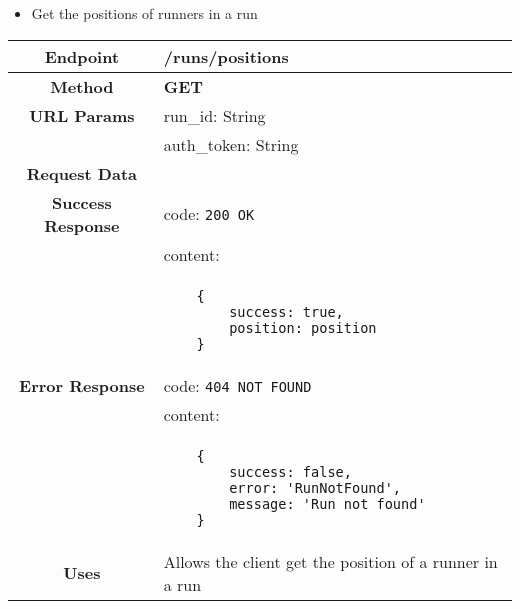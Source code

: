     
    \begin{itemize}
            \item Get the positions of runners in a run
        \end{itemize}
        \begin{adjustwidth}{1cm}{}
            \begin{longtable}{|c|l|}
                \hline
                \textbf{Endpoint} & /runs/positions \\
                \hline
                \textbf{Method} & \textbf{GET} \\
                \hline
                \textbf{URL Params} &  run\_id: String \\
                &                      auth\_token: String \\
                \hline
                \textbf{Request Data} & \\
                \hline
                \textbf{Success Response} & code: \texttt{200 OK} \\
                &                           content: \\
                & \begin{minipage}[t]{0.5\textwidth}
                    \begin{adjustwidth}{1.5cm}{}
                    \begin{verbatim}
    {
        success: true, 
        position: position
    }
                    \end{verbatim}
                    \end{adjustwidth}
                  \end{minipage} \\
                  \hline
                \textbf{Error Response} & code: \texttt{404 NOT FOUND} \\
                &                         content: \\
                & \begin{minipage}[t]{0.7\textwidth}
                    \begin{adjustwidth}{1.5cm}{}
                    \begin{verbatim}
    {
        success: false, 
        error: 'RunNotFound',
        message: 'Run not found'
    }
                    \end{verbatim}
                    \end{adjustwidth}
                  \end{minipage} \\
                  \hline
                \textbf{Uses} & Allows the client get the position of a runner in a run \\
                \hline
                

\end{longtable}
\end{adjustwidth}
